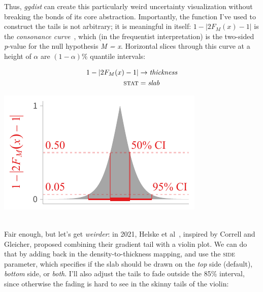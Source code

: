 \documentclass[journal]{vgtc}                     %
\newcommand{\equationfigure}[2]{%
\noindent
\begin{minipage}{.5\columnwidth}
\setlength{\abovedisplayskip}{0pt}
\setlength{\belowdisplayskip}{0pt}
#1\end{minipage}%
\begin{minipage}{.4\columnwidth}\centering #2 \end{minipage}%
\vspace{.5\belowdisplayskip}\\
}
\begin{document}
Thus, \textit{ggdist} can create this particularly weird uncertainty visualization without breaking the bonds of its core abstraction. Importantly, the function I've used to construct the tails is not arbitrary; it is meaningful in itself: $1 - \lvert 2 F_M(x) - 1 \rvert$ is the \textit{consonance curve}~\cite{amrhein2022discuss}, which (in the frequentist interpretation) is the two-sided \textit{p}-value for the null hypothesis \textit{M = x}. Horizontal slices through this curve at a height of $\alpha$ are $(1 - \alpha)\%$ quantile intervals:


\equationfigure{
\begin{align*}
1 - \lvert 2 F_M(x) - 1 \rvert &\rightarrow \textit{thickness}\\
\textsc{stat} &= \mathit{slab}
\end{align*}
}{\includegraphics[width=1.2\columnwidth]{figs/3-slab_consonance.pdf}}
Fair enough, but let's get \textit{weirder}: in 2021, Helske et al~\cite{helske2021can}, inspired by Correll and Gleicher, proposed combining their gradient tail with a violin plot. We can do that by adding back in the density-to-thickness mapping, and use the \textsc{side} parameter, which specifies if the slab should be drawn on the \textit{top} side (default), \textit{bottom} side, or \textit{both}. I'll also adjust the tails to fade outside the 85\% interval, since otherwise the fading is hard to see in the skinny tails of the violin:
\end{document}
